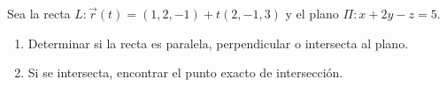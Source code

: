 Sea la recta $L: \vec{r}(t) = (1, 2, -1) + t(2, -1, 3)$ y el plano $\Pi: x + 2y - z = 5$.
\begin{enumerate}
    \item Determinar si la recta es paralela, perpendicular o intersecta al plano.
    \item Si se intersecta, encontrar el punto exacto de intersección.
\end{enumerate}